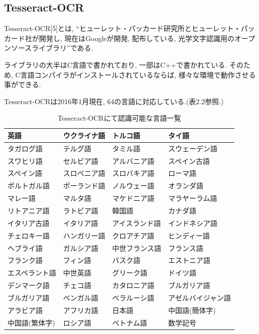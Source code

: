 \subsection{Tesseract-OCR}
Tesseract-OCR[5]とは, “ヒューレット・パッカード研究所とヒューレット・パッカード社が開発し, 現在はGoogleが開発, 配布している, 光学文字認識用のオープンソースライブラリ”である.

ライブラリの大半はC言語で書かれており, 一部はC++で書かれている.
そのため, C言語コンパイラがインストールされているならば, 様々な環境で動作させる事ができる.

Tesseract-OCRは2016年1月現在, 64の言語に対応している.(表2.2参照.)

\begin{table}[htb]
\begin{center}
\begin{tabular}{|p{3.5cm}|p{3.5cm}|p{3.5cm}|p{3.5cm}|} \hline
英語 & ウクライナ語 & トルコ語 & タイ語 \\ \hline
タガログ語 & テルグ語 & タミル語 & スウェーデン語 \\ \hline
スワヒリ語 & セルビア語 & アルバニア語 & スペイン古語 \\ \hline
スペイン語 & スロベニア語 & スロバキア語 & ローマ語 \\ \hline
ポルトガル語 & ポーランド語 & ノルウェー語 & オランダ語 \\ \hline
マレー語 & マルタ語 & マケドニア語 & マラヤーラム語 \\ \hline
リトアニア語 & ラトビア語 & 韓国語 & カナダ語 \\ \hline
イタリア古語 & イタリア語 & アイスランド語 & インドネシア語 \\ \hline
チェロキー語 & ハンガリー語 & クロアチア語 & ヒンディー語 \\ \hline
ヘブライ語 & ガルシア語 & 中世フランス語 & フランス語 \\ \hline
フランク語 & フィン語 & バスク語 & エストニア語 \\ \hline
エスペラント語 & 中世英語 & グリーク語 & ドイツ語 \\ \hline
デンマーク語 & チェコ語 & カタロニア語 & ブルガリア語 \\ \hline
ブルガリア語 & ベンガル語 & ベラルーシ語 & アゼルバイジャン語 \\ \hline
アラビア語 & アフリカ語 & 日本語 & 中国語(簡体字) \\ \hline
中国語(繁体字) & ロシア語 & ベトナム語 & 数学記号 \\ \hline
\end{tabular}
\caption{Tesseract-OCRにて認識可能な言語一覧}
\end{center}
\end{table}

